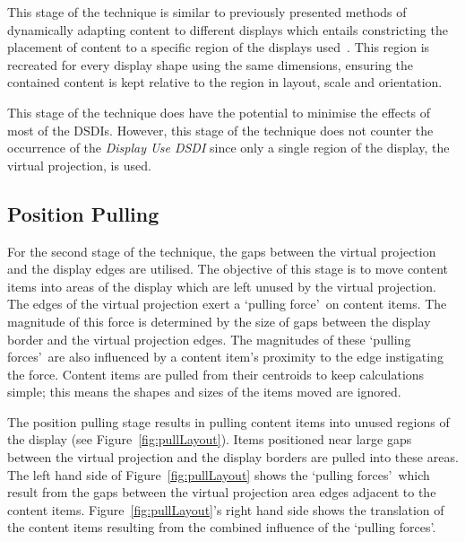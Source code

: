 \documentclass{bmcart}
\begin{document}
This stage of the technique is similar to previously presented methods of dynamically adapting content to different displays which entails constricting the placement of content to a specific region of the displays used~\cite{Cotting2006,Raskar2003}.
This region is recreated for every display shape using the same dimensions, ensuring the contained content is kept relative to the region in layout, scale and orientation.

This stage of the technique does have the potential to minimise the effects of most of the \acp{DSDI}.
However, this stage of the technique does not counter the occurrence of the {\emph{Display Use \ac{DSDI}}} since only a single region of the display, the virtual projection, is used.

\subsection*{Position Pulling}
\label{subsec:positionpulling} 


For the second stage of the technique, the gaps between the virtual projection and the display edges are utilised.
The objective of this stage is to move content items into areas of the display which are left unused by the virtual projection.
The edges of the virtual projection exert a \lq pulling force\rq\ on content items.
The magnitude of this force is determined by the size of gaps between the display border and the virtual projection edges.
The magnitudes of these \lq pulling forces\rq\ are also influenced by a content item's proximity to the edge instigating the force.
Content items are pulled from their centroids to keep calculations simple; this means the shapes and sizes of the items moved are ignored.

The position pulling stage results in pulling content items into unused regions of the display (see
Figure~\ref{fig:pullLayout}).
Items positioned near large gaps between the virtual projection and the display borders are pulled into these areas.
The left hand side of Figure~\ref{fig:pullLayout} shows the \lq pulling forces\rq\ which result from the gaps between the virtual projection area edges adjacent to the content items.
Figure~\ref{fig:pullLayout}'s right hand side shows the translation of the content items resulting from the combined influence of the \lq pulling forces\rq .


\end{document}
